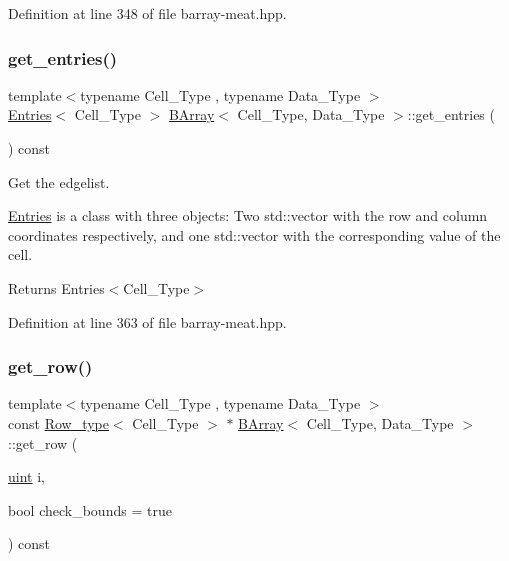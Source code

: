 Definition at line 348 of file barray-\/meat.\+hpp.

\mbox{\label{class_b_array_aee224325422d214624771a5b4d91b55e}} 
\subsubsection{\texorpdfstring{get\+\_\+entries()}{get\_entries()}}
{\footnotesize\ttfamily template$<$typename Cell\+\_\+\+Type , typename Data\+\_\+\+Type $>$ \\
\hyperlink{class_entries}{Entries}$<$ Cell\+\_\+\+Type $>$ \hyperlink{class_b_array}{B\+Array}$<$ Cell\+\_\+\+Type, Data\+\_\+\+Type $>$\+::get\+\_\+entries (\begin{DoxyParamCaption}{ }\end{DoxyParamCaption}) const\hspace{0.3cm}{\ttfamily [inline]}}



Get the edgelist. 

{\ttfamily \hyperlink{class_entries}{Entries}} is a class with three objects\+: Two {\ttfamily std\+::vector} with the row and column coordinates respectively, and one {\ttfamily std\+::vector} with the corresponding value of the cell.

\begin{DoxyReturn}{Returns}
Entries$<$\+Cell\+\_\+\+Type$>$ 
\end{DoxyReturn}


Definition at line 363 of file barray-\/meat.\+hpp.

\mbox{\label{class_b_array_a2c969ceb1d37eff9ebcac25741de1808}} 
\subsubsection{\texorpdfstring{get\+\_\+row()}{get\_row()}}
{\footnotesize\ttfamily template$<$typename Cell\+\_\+\+Type , typename Data\+\_\+\+Type $>$ \\
const \hyperlink{typedefs_8hpp_a4deca4f3fb25a4da374818ab459b8b4a}{Row\+\_\+type}$<$ Cell\+\_\+\+Type $>$ $\ast$ \hyperlink{class_b_array}{B\+Array}$<$ Cell\+\_\+\+Type, Data\+\_\+\+Type $>$\+::get\+\_\+row (\begin{DoxyParamCaption}\item[{\hyperlink{typedefs_8hpp_a91ad9478d81a7aaf2593e8d9c3d06a14}{uint}}]{i,  }\item[{bool}]{check\+\_\+bounds = {\ttfamily true} }\end{DoxyParamCaption}) const\hspace{0.3cm}{\ttfamily [inline]}}



